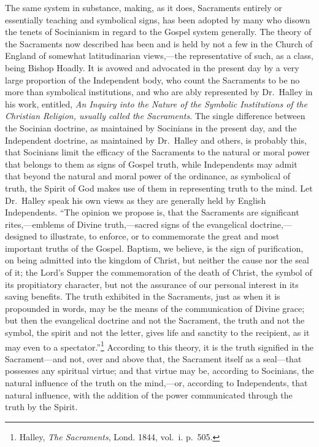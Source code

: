 \documentclass[]{book}
\begin{document}
The same system in substance, making, as it does, Sacraments entirely or essentially teaching and symbolical signs, has been adopted by many who disown the tenets of Socinianism in regard to the Gospel system generally. The theory of the Sacraments now described has been and is held by not a few in the Church of England of somewhat latitudinarian views,---the representative of such, as a class, being Bishop Hoadly. It is avowed and advocated in the present day by a very large proportion of the Independent body, who count the Sacraments to be no more than symbolical institutions, and who are ably represented by Dr.~Halley in his work, entitled, \emph{An Inquiry into the Nature of the Symbolic Institutions of the Christian Religion, usually called the Sacraments}. The single difference between the Socinian doctrine, as maintained by Socinians in the present day, and the Independent doctrine, as maintained by Dr.~Halley and others, is probably this, that Socinians limit the efficacy of the Sacraments to the natural or moral power that belongs to them as signs of Gospel truth, while Independents may admit that beyond the natural and moral power of the ordinance, as symbolical of truth, the Spirit of God makes use of them in representing truth to the mind. Let Dr.~Halley speak his own views as they are generally held by English Independents. ``The opinion we propose is, that the Sacraments are significant rites,---emblems of Divine truth,---sacred signs of the evangelical doctrine,---designed to illustrate, to enforce, or to commemorate the great and most important truths of the Gospel. Baptism, we believe, is the sign of purification, on being admitted into the kingdom of Christ, but neither the cause nor the seal of it; the Lord's Supper the commemoration of the death of Christ, the symbol of its propitiatory character, but not the assurance of our personal interest in its saving benefits. The truth exhibited in the Sacraments, just as when it is propounded in words, may be the means of the communication of Divine grace; but then the evangelical doctrine and not the Sacrament, the truth and not the symbol, the spirit and not the letter, gives life and sanctity to the recipient, as it may even to a spectator.''\footnote{Halley, \emph{The Sacraments}, Lond. 1844, vol.~i. p.~505.} According to this theory, it is the truth signified in the Sacrament---and not, over and above that, the Sacrament itself as a seal---that possesses any spiritual virtue; and that virtue may be, according to Socinians, the natural influence of the truth on the mind,---or, according to Independents, that natural influence, with the addition of the power communicated through the truth by the Spirit.
\end{document}
